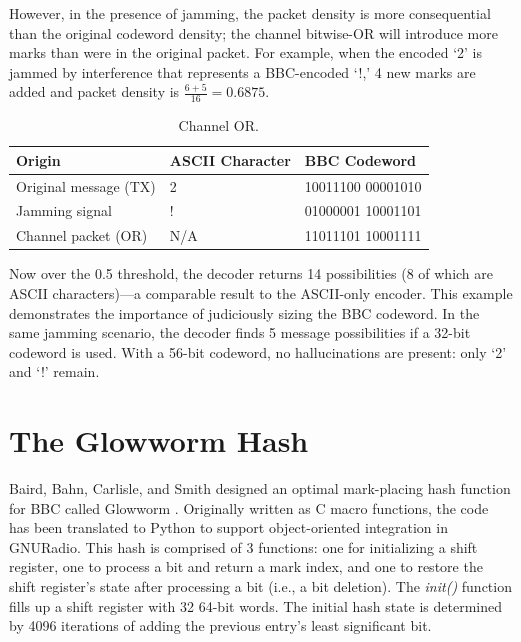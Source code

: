 \documentclass[conference]{IEEEtran}
\begin{document}
However, in the presence of jamming, the packet density is more consequential than the original codeword density; the channel bitwise-OR will introduce more marks than were in the original packet. For example, when the encoded ‘2’ is jammed by interference that represents a BBC-encoded ‘!,’ 4 new marks are added and packet density is $\frac{6+5}{16}=0.6875$. 

\begin{table}[h]
\label{BBC Packet}
    \centering
    \caption{Channel OR. }
    \begin{center}
    \begin{tabular}{ | m{10em} | m{1.2cm}| m{2.35cm} | } 
      \hline
      Origin & ASCII Character & BBC Codeword \\ 
      \hline
      Original message (TX) & 2 &  10011100  00001010\\ 
      \hline
      Jamming signal        & ! &  01000001  10001101\\ 
      \hline
      Channel packet (OR)   &  N/A &  11011101  10001111 \\ 
      \hline
    \end{tabular}
    \end{center}
\end{table}

Now over the 0.5 threshold, the decoder returns 14 possibilities (8 of which are ASCII characters)—a comparable result to the ASCII-only encoder. This example demonstrates the importance of judiciously sizing the BBC codeword. In the same jamming scenario, the decoder finds 5 message possibilities if a 32-bit codeword is used. With a 56-bit codeword, no hallucinations are present: only ‘2’ and ‘!’ remain. 

\section{The Glowworm Hash}

Baird, Bahn, Carlisle, and Smith designed an optimal mark-placing hash function for BBC called Glowworm \cite{glowworm}. Originally written as C macro functions, the code has been translated to Python to support object-oriented integration in GNURadio. This hash is comprised of 3 functions: one for initializing a shift register, one to process a bit and return a mark index, and one to restore the shift register’s state after processing a bit (i.e., a bit deletion). The \textit{init()} function fills up a shift register with 32 64-bit words. The initial hash state is determined by 4096 iterations of adding the previous entry’s least significant bit. 
\end{document}
